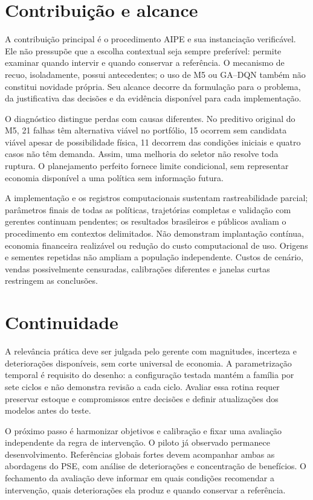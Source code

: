 \section{Contribuição e alcance}
A contribuição principal é o procedimento AIPE e sua instanciação verificável. Ele não pressupõe que a escolha contextual seja sempre preferível: permite examinar quando intervir e quando conservar a referência. O mecanismo de recuo, isoladamente, possui antecedentes; o uso de M5 ou GA--DQN também não constitui novidade própria. Seu alcance decorre da formulação para o problema, da justificativa das decisões e da evidência disponível para cada implementação.

O diagnóstico distingue perdas com causas diferentes. No preditivo original do M5, 21 falhas têm alternativa viável no portfólio, 15 ocorrem sem candidata viável apesar de possibilidade física, 11 decorrem das condições iniciais e quatro casos não têm demanda. Assim, uma melhoria do seletor não resolve toda ruptura. O planejamento perfeito fornece limite condicional, sem representar economia disponível a uma política sem informação futura.

A implementação e os registros computacionais sustentam rastreabilidade parcial; parâmetros finais de todas as políticas, trajetórias completas e validação com gerentes continuam pendentes; os resultados brasileiros e públicos avaliam o procedimento em contextos delimitados. Não demonstram implantação contínua, economia financeira realizável ou redução do custo computacional de uso. Origens e sementes repetidas não ampliam a população independente. Custos de cenário, vendas possivelmente censuradas, calibrações diferentes e janelas curtas restringem as conclusões.

\section{Continuidade}
A relevância prática deve ser julgada pelo gerente com magnitudes, incerteza e deteriorações disponíveis, sem corte universal de economia. A parametrização temporal é requisito do desenho: a configuração testada mantém a família por sete ciclos e não demonstra revisão a cada ciclo. Avaliar essa rotina requer preservar estoque e compromissos entre decisões e definir atualizações dos modelos antes do teste.

O próximo passo é harmonizar objetivos e calibração e fixar uma avaliação independente da regra de intervenção. O piloto já observado permanece desenvolvimento. Referências globais fortes devem acompanhar ambas as abordagens do PSE, com análise de deteriorações e concentração de benefícios. O fechamento da avaliação deve informar em quais condições recomendar a intervenção, quais deteriorações ela produz e quando conservar a referência.
